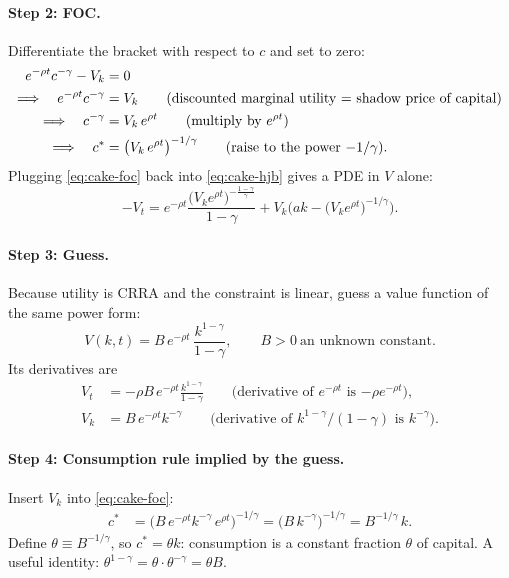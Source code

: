 \paragraph{Step 2: FOC.} Differentiate the bracket with respect to $c$ and set to zero:
\begin{align}
e^{-\rho t}c^{-\gamma}-V_k&=0\notag\\
\Longrightarrow\quad e^{-\rho t}c^{-\gamma}&=V_k\qquad\text{(discounted marginal utility = shadow price of capital)}\notag\\
\Longrightarrow\quad c^{-\gamma}&=V_k\,e^{\rho t}\qquad\text{(multiply by $e^{\rho t}$)}\notag\\
\Longrightarrow\quad c^*&=\big(V_k\,e^{\rho t}\big)^{-1/\gamma}\qquad\text{(raise to the power $-1/\gamma$).}\label{eq:cake-foc}
\end{align}
Plugging \eqref{eq:cake-foc} back into \eqref{eq:cake-hjb} gives a PDE in $V$ alone:
\[
-V_t=e^{-\rho t}\frac{\big(V_ke^{\rho t}\big)^{-\frac{1-\gamma}{\gamma}}}{1-\gamma}+V_k\Big(ak-\big(V_ke^{\rho t}\big)^{-1/\gamma}\Big).
\]

\paragraph{Step 3: Guess.} Because utility is CRRA and the constraint is linear, guess a value function of the same power form:
\begin{equation}\label{eq:cake-guess}
V(k,t)=B\,e^{-\rho t}\,\frac{k^{1-\gamma}}{1-\gamma},\qquad B>0\ \text{an unknown constant}.
\end{equation}
Its derivatives are
\begin{align*}
V_t&=-\rho B\,e^{-\rho t}\frac{k^{1-\gamma}}{1-\gamma}\qquad\text{(derivative of $e^{-\rho t}$ is $-\rho e^{-\rho t}$)},\\
V_k&=B\,e^{-\rho t}k^{-\gamma}\qquad\text{(derivative of $k^{1-\gamma}/(1-\gamma)$ is $k^{-\gamma}$)}.
\end{align*}

\paragraph{Step 4: Consumption rule implied by the guess.} Insert $V_k$ into \eqref{eq:cake-foc}:
\begin{align*}
c^*&=\big(B\,e^{-\rho t}k^{-\gamma}\,e^{\rho t}\big)^{-1/\gamma}=\big(B\,k^{-\gamma}\big)^{-1/\gamma}=B^{-1/\gamma}\,k.
\end{align*}
Define $\theta\equiv B^{-1/\gamma}$, so $c^*=\theta k$: consumption is a constant fraction $\theta$ of capital. A useful identity: $\theta^{1-\gamma}=\theta\cdot\theta^{-\gamma}=\theta B$.

